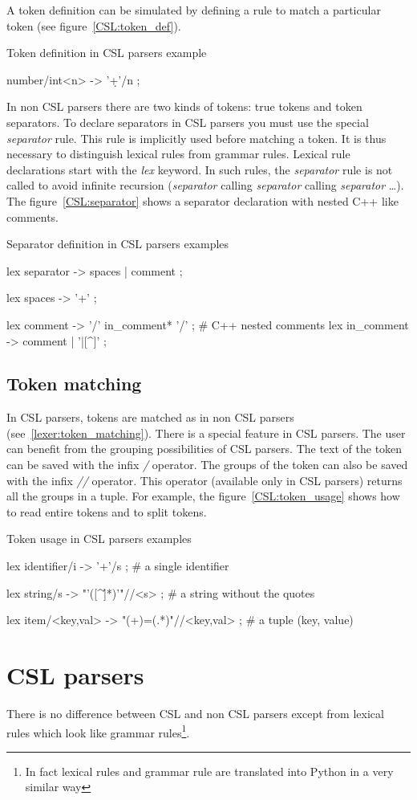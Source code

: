 A token definition can be simulated by defining a rule to match a particular token (see figure~\ref{CSL:token_def}).

\begin{code}
\caption{Token definition in CSL parsers example}			\label{CSL:token_def}
\begin{verbatimtab}[4]
	number/int<n> -> '\d+'/n ;
\end{verbatimtab}
\end{code}

In non CSL parsers there are two kinds of tokens: true tokens and token separators.
To declare separators in CSL parsers you must use the special \emph{separator} rule.
This rule is implicitly used before matching a token.
It is thus necessary to distinguish lexical rules from grammar rules.
Lexical rule declarations start with the \emph{lex} keyword.
In such rules, the \emph{separator} rule is not called to avoid infinite recursion (\emph{separator} calling \emph{separator} calling \emph{separator} \ldots).
The figure~\ref{CSL:separator} shows a separator declaration with nested C++ like comments.

\begin{code}
\caption{Separator definition in CSL parsers examples}		\label{CSL:separator}
\begin{verbatimtab}[4]
	lex separator -> spaces | comment ;

	lex spaces -> '\s+' ;

	lex comment -> '/\*' in_comment* '\*/' ;        # C++ nested comments
	lex in_comment -> comment | '\*[^/]|[^\*]' ;
\end{verbatimtab}
\end{code}

\subsection{Token matching}

In CSL parsers, tokens are matched as in non CSL parsers (see~\ref{lexer:token_matching}).
There is a special feature in CSL parsers.
The user can benefit from the grouping possibilities of CSL parsers.
The text of the token can be saved with the infix \emph{/} operator.
The groups of the token can also be saved with the infix \emph{//} operator.
This operator (available only in CSL parsers) returns all the groups in a tuple.
For example, the figure~\ref{CSL:token_usage} shows how to read entire tokens and to split tokens.

\begin{code}
\caption{Token usage in CSL parsers examples}				\label{CSL:token_usage}
\begin{verbatimtab}[4]
	lex identifier/i -> '\w+'/s ;			# a single identifier

	lex string/s -> "'([^\']*)'"//<s> ;		# a string without the quotes

	lex item/<key,val> -> "(\w+)=(.*)"//<key,val> ;	# a tuple (key, value)
\end{verbatimtab}
\end{code}

\section{CSL parsers}

There is no difference between CSL and non CSL parsers except from lexical rules which look like grammar rules\footnote{In fact lexical rules and grammar rule are translated into Python in a very similar way}.
